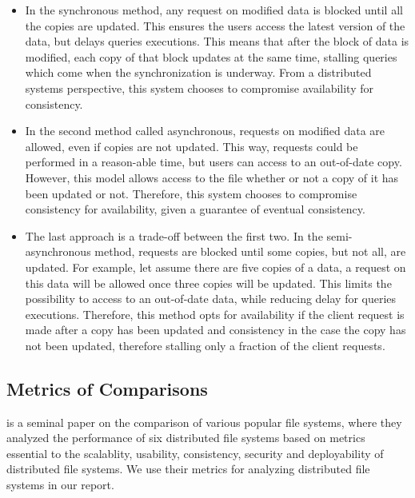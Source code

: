 \documentclass{article}
\begin{document}
\begin{itemize}
    \item In the synchronous method, any request on modified data is blocked until all the copies are updated.  This ensures the users access the latest version of the data, but delays queries executions. This means that after the block of data is modified, each copy of that block updates at the same time, stalling queries which come when the synchronization is underway. From a distributed systems perspective, this system chooses to compromise availability for consistency.
    
    \item In the second method called asynchronous, requests on modified data are allowed, even if copies are not updated.  This way, requests could be performed in a reason-able time, but users can access to an out-of-date copy. However, this model allows access to the file whether or not a copy of it has been updated or not. Therefore, this system chooses to compromise consistency for availability, given a guarantee of eventual consistency.
    
    \item The last approach is a trade-off between the first two.  In the semi-asynchronous method,  requests are blocked until some copies, but not all, are updated. For example, let assume there are five copies of a data, a request on this data will be allowed once three copies will be updated.  This limits the possibility to access to an out-of-date data, while reducing delay for queries executions. Therefore, this method opts for availability if the client request is made after a copy has been updated and consistency in the case the copy has not been updated, therefore stalling only a fraction of the client requests.
\end{itemize}

\subsection{Metrics of Comparisons}

is a seminal paper on the comparison of various popular file systems, where they analyzed the performance of six distributed file systems based on metrics essential to the scalablity, usability, consistency, security and deployability of distributed file systems. We use their metrics for analyzing distributed file systems in our report.
\end{document}
